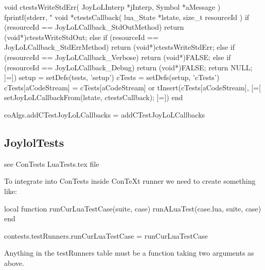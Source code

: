 void ctestsWriteStdErr(
  JoyLoLInterp *jInterp,
  Symbol       *aMessage
) {
  fprintf(stderr, "%
}
void *ctestsCallback(
  lua_State *lstate,
  size_t resourceId
) {
  if (resourceId == JoyLoLCallback_StdOutMethod) {
    return (void*)ctestsWriteStdOut;
  } else if (resourceId == JoyLoLCallback_StdErrMethod) {
    return (void*)ctestsWriteStdErr;
  } else if (resourceId == JoyLoLCallback_Verbose) {
    return (void*)FALSE;
  } else if (resourceId == JoyLoLCallback_Debug) {
    return (void*)FALSE;
  }
  return NULL;
} 
]=])
  setup               = setDefs(tests, 'setup')
  cTests              = setDefs(setup, 'cTests')
  cTests[aCodeStream] = cTests[aCodeStream] or { }
  tInsert(cTests[aCodeStream], [=[
setJoyLoLCallbackFrom(lstate, ctestsCallback);
]=])
end

coAlgs.addCTestJoyLoLCallbacks = addCTestJoyLoLCallbacks
\stopLuaCode

\subsection{JoylolTests}

see ConTests LuaTests.tex file

To integrate into ConTests inside ConTeXt runner we need to create something like:

local function runCurLuaTestCase(suite, case)
  runALuaTest(case.lua, suite, case)
end

contests.testRunners.runCurLuaTestCase = runCurLuaTestCase

Anything in the testRunners table must be a function taking two arguments as above.